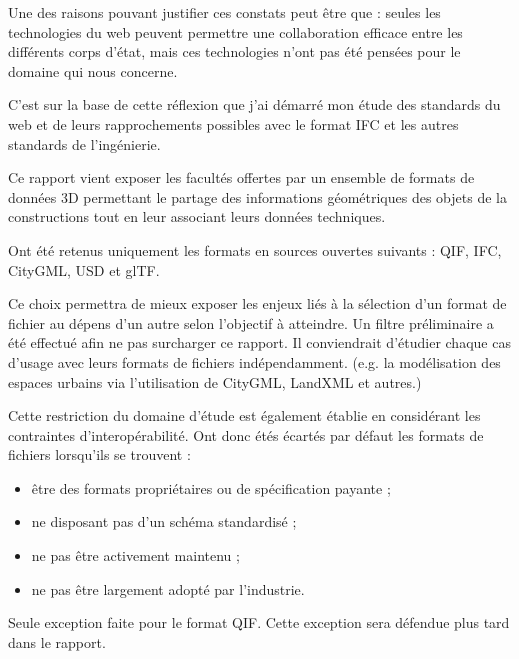 Une des raisons pouvant justifier ces constats peut être que : seules les technologies du web peuvent permettre une collaboration efficace entre les différents corps d'état, mais ces technologies n'ont pas été pensées pour le domaine qui nous concerne.

C'est sur la base de cette réflexion que j'ai démarré mon étude des standards du web et de leurs rapprochements possibles avec le format IFC et les autres standards de l'ingénierie.

Ce rapport vient exposer les facultés offertes par un ensemble de formats de données 3D permettant le partage des informations géométriques des objets de la constructions tout en leur associant leurs données techniques. 

Ont été retenus uniquement les formats en sources ouvertes suivants : QIF, IFC, CityGML, USD et glTF.

Ce choix permettra de mieux exposer les enjeux liés à la sélection d'un format de fichier au dépens d'un autre selon l'objectif à atteindre. Un filtre préliminaire a été effectué afin ne pas surcharger ce rapport. Il conviendrait d'étudier chaque cas d'usage avec leurs formats de fichiers indépendamment. (e.g. la modélisation des espaces urbains via l'utilisation de CityGML, LandXML et autres.)

Cette restriction du domaine d'étude est également établie en considérant les contraintes d'interopérabilité. Ont donc étés écartés par défaut les formats de fichiers lorsqu'ils se trouvent :
\begin{itemize}
    \item être des formats propriétaires ou de spécification payante ;
    \item ne disposant pas d'un schéma standardisé ;
    \item ne pas être activement maintenu ;
    \item ne pas être largement adopté par l'industrie.
\end{itemize}

Seule exception faite pour le format QIF. Cette exception sera défendue plus tard dans le rapport.

\smallskip






